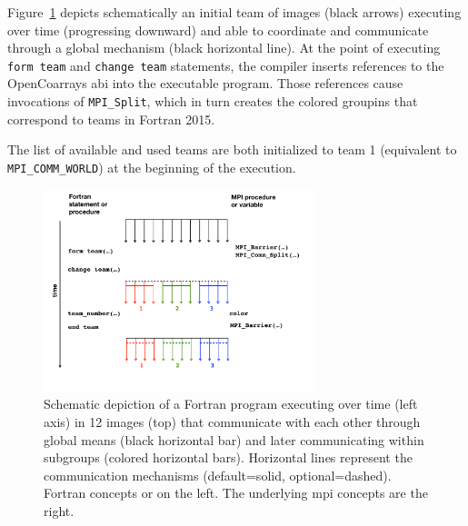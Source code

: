 Figure~\ref{fig:teams} depicts schematically an initial team of images (black arrows) executing over time (progressing
downward) and able to coordinate and communicate through a global mechanism (black horizontal line).  At the point of executing
\texttt{form team} and \texttt{change team} statements, the compiler inserts references to the OpenCoarrays \gls{abi} into the
executable program.  Those references cause invocations of \texttt{MPI\_Split}, which in turn creates the colored groupins that
correspond to teams in Fortran 2015.


The list of available and used teams are both initialized to team 1 (equivalent to \texttt{MPI\_COMM\_WORLD}) at the beginning of the execution.

\begin{figure}
\includegraphics[width=0.7\textwidth]{figures/teams}
\vspace{-36pt}
\caption{Schematic depiction of a Fortran program executing over time
  (left axis) in 12 images (top) that communicate with each other through global means (black horizontal bar) and later communicating within subgroups (colored horizontal bars).  Horizontal lines represent the communication mechanisms (default=solid, optional=dashed).  Fortran concepts or on the left.  The underlying \gls{mpi} concepts are the right.\label{fig:teams}}
\end{figure}
%


